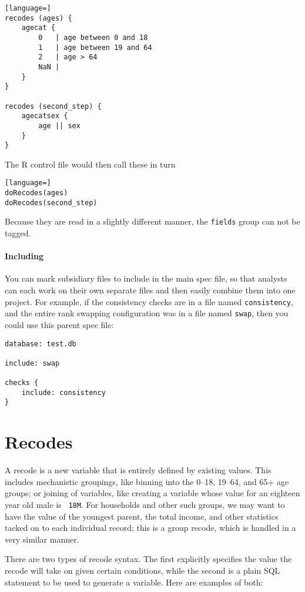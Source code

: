 \documentclass{article}
\begin{document}
\begin{lstlisting}[language=]
recodes (ages) {
    agecat {
        0   | age between 0 and 18
        1   | age between 19 and 64
        2   | age > 64
        NaN |
    }
}

recodes (second_step) {
    agecatsex {
        age || sex
    }
}
\end{lstlisting}

The R control file would then call these in turn

\begin{lstlisting}[language=]
doRecodes(ages)
doRecodes(second_step)
\end{lstlisting}

Because they are read in a slightly different manner, the {\tt fields} group can not be tagged.


\paragraph{Including} You can mark subsidiary files to include in the main
spec file, so that analysts can each work on their own separate files and then
easily combine them into one project. For
example, if the consistency checks are in a file named {\tt consistency}, and
the entire rank swapping configuration was in a file named {\tt swap}, then you
could use this parent spec file:
\begin{verbatim}
database: test.db

include: swap

checks {
    include: consistency
}
\end{verbatim}

\section{Recodes}

A recode is a new variable that is entirely defined by existing values. This includes 
mechanistic groupings, like binning into the 0--18, 19--64, and 65+ age groups; or joining of
variables, like creating a variable whose value for an eighteen year old male is {\tt
18M}. For households and other such groups, we may want to have the value of the youngest
parent, the total income, and other statistics tacked on to each individual record; this
is a group recode, which is handled in a very similar manner.

There are two types of recode syntax. The first explicitly specifies the value the recode
will take on given certain conditions, while the second is a plain SQL statement to be
used to generate a variable. Here are examples of both:
\end{document}
